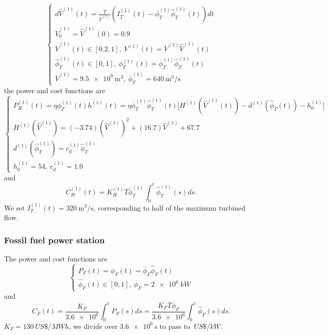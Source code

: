 \documentclass[12pt]{article}
\theoremstyle{definition}
\theoremstyle{remark}
\begin{document}
\begin{equation*}
\begin{cases}
d\hat{V}^{(1)}(t)=\frac{\overline{T}}{\overline{V}^{(1)}}(I_T^{(1)}(t)-\overline{\phi}_T^{(1)}\hat{\phi}_T^{(1)}(t))dt\\
\hat{V}_0^{(1)}=\hat{V}^{(1)}(0)=0.9\\
\hat{V}^{(1)}(t)\in[0.2,1],\ V^{(1)}(t)=\overline{V}^{(1)}\hat{V}^{(1)}(t)\\
\hat{\phi}_T^{(1)}(t)\in[0,1],\ \phi_T^{(1)}(t)=\overline{\phi}_T^{(1)}\hat{\phi}_T^{(1)}(t)\\
\overline{V}^{(1)}=\SI{9.5e9}{\m^3},\ \overline{\phi}_T^{(1)}=\SI{640}{\m^3/\s}
\end{cases}
\end{equation*}
the power and cost functions are
\begin{equation*}
\begin{cases}
P_H^{(1)}(t)=\eta\phi_T^{(1)}(t)h^{(1)}(t)=\eta\overline{\phi}_T^{(1)}\hat{\phi}_T^{(1)}(t)\Big[H^{(1)}(\hat{V}^{(1)}(t))-d^{(1)}(\hat{\phi}_T(t))-h_0^{(1)}\Big]\\
H^{(1)}(\hat{V}^{(1)})=(-3.74)(\hat{V}^{(1)})^2+(16.7)\hat{V}^{(1)}+67.7\\
d^{(1)}(\hat{\phi}_T^{(1)})=c_d^{(1)}\hat{\phi}_T^{(1)}\\
h_0^{(1)}=54,\ c_d^{(1)}=1.0
\end{cases}
\end{equation*}
and
\begin{equation*}
C_H^{(1)}(t)=K_H^{(1)}\overline{T}\overline{\phi}_T^{(1)}\int_0^t\hat{\phi}_T^{(1)}(s)ds.
\end{equation*}
We set $I_T^{(1)}(t)=\SI{320}{\m^3/\s}$, corresponding to half of the maximum turbined flow.

\subsubsection{Fossil fuel power station}

The power and cost functions are
\begin{equation*}
\begin{cases}
P_F(t)=\phi_F(t)=\overline{\phi}_F\hat{\phi}_F(t)\\
\hat{\phi}_F(t)\in[0,1],\ \overline{\phi}_F=\SI{2e6}{kW}
\end{cases}
\end{equation*}
and
\begin{equation*}
C_F(t)=\frac{K_F}{\num{3.6e6}}\int_0^tP_F(s)ds=\frac{K_F\overline{T}\overline{\phi}_F}{\num{3.6e6}}\int_0^t\hat{\phi}_F(s)ds.
\end{equation*}
$K_F=\SI{130}{US\$/MWh}$, we divide over $\SI{3.6e6}{\s}$ to pass to $\SI{}{US\$/kW}$.
\end{document}
